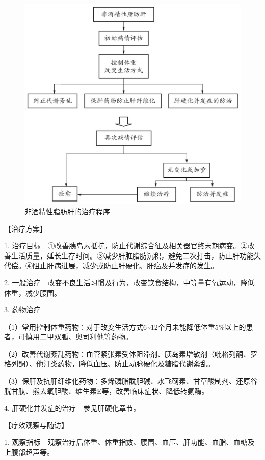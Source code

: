 \begin{figure}[!htbp]
 \centering
 \includegraphics{./images/Image00103.jpg}
 \captionsetup{justification=centering}
 \caption{非酒精性脂肪肝的治疗程序}
 \label{fig3-14-1}
  \end{figure} 

【治疗方案】

1.
治疗目标　①改善胰岛素抵抗，防止代谢综合征及相关器官终末期病变。②改善生活质量，延长生存时间。③减少肝脏脂肪沉积，避免二次打击，防止肝功能失代偿。④阻止肝病进展，减少或防止肝硬化、肝癌及并发症的发生。

2.
一般治疗　改变不良生活习惯及行为，改变饮食结构，中等量有氧运动，降低体重，减少腰围。

3. 药物治疗

（1）常用控制体重药物：对于改变生活方式6\textasciitilde{}12个月未能降低体重5\%以上的患者，可慎用二甲双胍、奥司利他等药物。

（2）改善代谢紊乱药物：血管紧张素受体阻滞剂、胰岛素增敏剂（吡格列酮、罗格列酮）、他汀类药物，降低血压、防止动脉硬化及糖脂代谢紊乱。

（3）保肝及抗肝纤维化药物：多烯磷脂酰胆碱、水飞蓟素、甘草酸制剂、还原谷胱甘肽、熊去氧胆酸、维生素E等，改善临床症状、降低转氨酶。

4. 肝硬化并发症的治疗　参见肝硬化章节。

【疗效观察与随访】

1.
观察指标　观察治疗后体重、体重指数、腰围、血压、肝功能、血脂、血糖及上腹部超声等。

